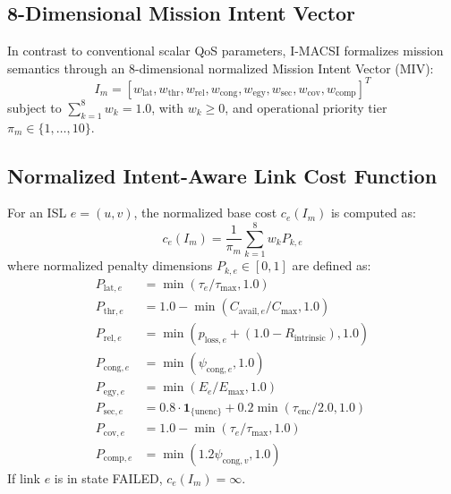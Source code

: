 \documentclass[journal]{IEEEtran}
\begin{document}
\subsection{8-Dimensional Mission Intent Vector}
In contrast to conventional scalar QoS parameters, I-MACSI formalizes mission semantics through an 8-dimensional normalized Mission Intent Vector (MIV):
\begin{equation}
I_m = [ w_{\text{lat}}, w_{\text{thr}}, w_{\text{rel}}, w_{\text{cong}}, w_{\text{egy}}, w_{\text{sec}}, w_{\text{cov}}, w_{\text{comp}} ]^T
\label{eq:intent_vec}
\end{equation}
subject to $\sum_{k=1}^8 w_k = 1.0$, with $w_k \ge 0$, and operational priority tier $\pi_m \in \{1, \dots, 10\}$.

\subsection{Normalized Intent-Aware Link Cost Function}
For an ISL $e = (u, v)$, the normalized base cost $c_e(I_m)$ is computed as:
\begin{equation}
c_e(I_m) = \frac{1}{\pi_m} \sum_{k=1}^8 w_k P_{k,e}
\label{eq:cost}
\end{equation}
where normalized penalty dimensions $P_{k,e} \in [0, 1]$ are defined as:
\begin{align}
P_{\text{lat},e} &= \min(\tau_e / \tau_{\max}, 1.0) \\
P_{\text{thr},e} &= 1.0 - \min(C_{\text{avail},e} / C_{\max}, 1.0) \\
P_{\text{rel},e} &= \min(p_{\text{loss},e} + (1.0 - R_{\text{intrinsic}}), 1.0) \\
P_{\text{cong},e} &= \min(\psi_{\text{cong},e}, 1.0) \\
P_{\text{egy},e} &= \min(E_e / E_{\max}, 1.0) \\
P_{\text{sec},e} &= 0.8 \cdot \mathbf{1}_{\{\text{unenc}\}} + 0.2 \min(\tau_{\text{enc}} / 2.0, 1.0) \\
P_{\text{cov},e} &= 1.0 - \min(\tau_e / \tau_{\max}, 1.0) \\
P_{\text{comp},e} &= \min(1.2 \psi_{\text{cong},v}, 1.0)
\end{align}
If link $e$ is in state FAILED, $c_e(I_m) = \infty$.
\end{document}
